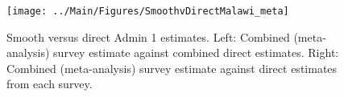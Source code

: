 \documentclass[12pt]{article}\usepackage[]{graphicx}\usepackage[]{color}
\newenvironment{knitrout}{}{} %
\begin{document}



\begin{knitrout}
\color{fgcolor}\begin{figure}[bht]

{\centering \texttt{[image: ../Main/Figures/SmoothvDirectMalawi\_meta]} 

}

\caption[Smooth versus direct Admin 1 estimates]{Smooth versus direct Admin 1 estimates. Left: Combined (meta-analysis) survey estimate against combined direct estimates. Right: Combined (meta-analysis) survey estimate against direct estimates from each survey.}\label{fig:unnamed-chunk-203}
\end{figure}


\end{knitrout}
\end{document}
